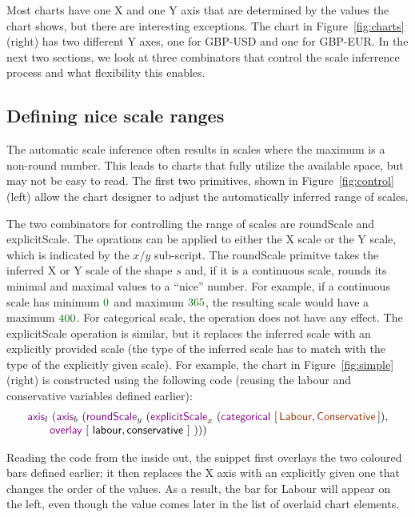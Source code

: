 \documentclass{jfp}
\newcommand{\num}[1]{\textcolor{numclr}{#1}}
\newcommand{\strf}[1]{\textnormal{\textcolor{strclr}{\sffamily #1}}}
\newcommand{\ident}[1]{\textnormal{\textcolor{idclr}{\sffamily #1}}}
\newcommand{\kvd}[1]{\textnormal{\textcolor{kvdclr}{\sffamily #1}}}
\begin{document}
Most charts have one X and one Y axis that are determined by the values the chart shows,
but there are interesting exceptions. The chart in Figure~\ref{fig:charts} (right)
has two different Y axes, one for GBP-USD and one for GBP-EUR. In the next two sections, we look at
three combinators that control the scale inferrence process and what flexibility this enables.

\subsection{Defining nice scale ranges}

The automatic scale inference often results in scales where the maximum is a non-round number.
This leads to charts that fully utilize the available space, but may not be easy to read.
The first two primitives, shown in Figure~\ref{fig:control} (left) allow the chart designer
to adjust the automatically inferred range of scales.

The two combinators for controlling the range of scales are \kvd{roundScale} and \kvd{explicitScale}.
The oprations can be applied to either the X scale or the Y scale, which is indicated by the
$x/y$ sub-script. The \kvd{roundScale} primitve takes the inferred X or Y scale of the shape $s$
and, if it is a continuous scale, rounds its minimal and maximal values to a ``nice'' number.
For example, if a continuous scale has minimum $\num{0}$ and maximum $\num{365}$, the resulting
scale would have a maximum $\num{400}$. For categorical scale, the operation does not have any effect.
The \kvd{explicitScale} operation is similar, but it replaces the inferred scale with an explicitly
provided scale (the type of the inferred scale has to match with the type of the explicitly given
scale). For example, the chart in Figure~\ref{fig:simple} (right) is constructed using the
following code (reusing the \ident{labour} and \ident{conservative} variables defined earlier):
%
\begin{equation*}
\begin{array}{l}
\kvd{axis}_l~(\kvd{axis}_b~(\kvd{roundScale}_y~(\kvd{explicitScale}_x~(\kvd{categorical}~[\,\strf{Labour},\strf{Conservative}\,]),\\
\qquad \kvd{overlay}~[~\ident{labour}, \ident{conservative}~]~)))\\
\end{array}
\end{equation*}
\vspace{-0.5em}

\noindent
Reading the code from the inside out, the snippet first overlays the two coloured bars defined
earlier; it then replaces the X axis with an explicitly given one that changes the order of the
values. As a result, the bar for \strf{Labour} will appear on the left, even though the value
comes later in the list of overlaid chart elements.
\end{document}
